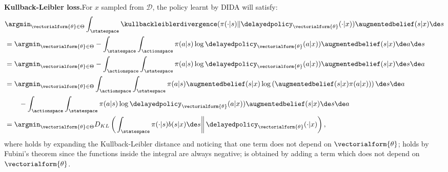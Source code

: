 \noindent\textbf{Kullback-Leibler loss.}\indent For $x$ sampled from $\mathcal{D}$, the policy learnt by DIDA will satisfy:
\begin{align}
    &\argmin_{\vectorialform{\theta}\in\Theta} \int_{\statespace} \kullbackleiblerdivergence(\pi(\cdot \vert s) \Vert \delayedpolicy_{\vectorialform{\theta}}(\cdot \vert x)) \augmentedbelief(s\vert x)\de s\nonumber
    \\
    &= \argmin_{\vectorialform{\theta}\in\Theta} - \int_{\statespace} \int_{\actionspace} \pi(a \vert s) \log \delayedpolicy_{\vectorialform{\theta}}(a \vert x)) \augmentedbelief(s\vert x)\de a \de s\label{eq:indpt_theta}
    \\
    &= \argmin_{\vectorialform{\theta}\in\Theta}  - \int_{\actionspace}\int_{\statespace}  \pi(a \vert s) \log \delayedpolicy_{\vectorialform{\theta}}(a \vert x)) \augmentedbelief(s\vert x)\de s \de a\label{eq:fubini}
    \\
    &= \argmin_{\vectorialform{\theta}\in\Theta}  \int_{\actionspace} \int_{\statespace}  \pi(a \vert s) \augmentedbelief(s\vert x)\log\left(\augmentedbelief(s\vert x) \pi(a \vert x))\right)\de s\de a\nonumber
    \\
    &\qquad- \int_{\actionspace}\int_{\statespace}  \pi(a \vert s) \log \delayedpolicy_{\vectorialform{\theta}}(a \vert x)) \augmentedbelief(s\vert x)\de s\de a\label{eq:add_pas_depend_theta}
    \\
    &= \argmin_{\vectorialform{\theta}\in\Theta}  D_{KL}\left(\left.\int_{\statespace}\pi(\cdot \vert s)b(s\vert x)\de s \right\Vert \delayedpolicy_{\vectorialform{\theta}}(\cdot \vert x)\right) ,\nonumber
\end{align}
where  holds by expanding the Kullback-Leibler distance and noticing that one term does not depend on $\vectorialform{\theta}$;  holds by Fubini's theorem since the functions inside the integral are always negative;  is obtained by adding a term which does not depend on $\vectorialform{\theta}$.



